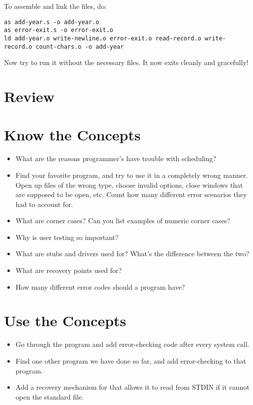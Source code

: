To assemble and link the files, do:

\begin{simpletyping}
\begin{lstlisting}
as add-year.s -o add-year.o
as error-exit.s -o error-exit.o
ld add-year.o write-newline.o error-exit.o read-record.o write-record.o count-chars.o -o add-year
\end{lstlisting}
\end{simpletyping}

Now try to run it without the necessary files.  It now exits cleanly and
gracefully!

\section{Review}

\section{Know the Concepts}

\begin{itemize}\item What are the reasons programmer's have trouble with scheduling? 
\item Find your favorite program, and try to use it in a completely wrong manner.  Open up files of the wrong type, choose invalid options, close windows that are supposed to be open, etc.  Count how many different error scenarios they had to account for. 
\item What are corner cases?  Can you list examples of numeric corner cases? 
\item Why is user testing so important? 
\item What are stubs and drivers used for?  What's the difference between the two? 
\item What are recovery points used for? 
\item How many different error codes should a program have? 
\end{itemize}

\section{Use the Concepts}

\begin{itemize}\item Go through the  program and add error-checking code after every system call. 
\item Find one other program we have done so far, and add error-checking to that program. 
\item Add a recovery mechanism for  that allows it to read from STDIN if it cannot open the standard file. 
\end{itemize}


